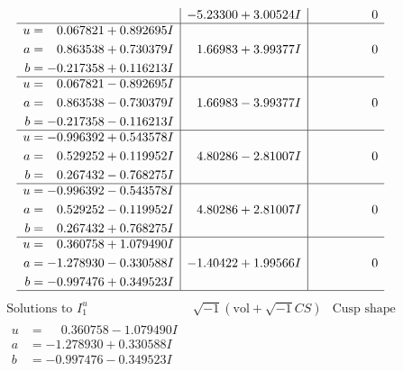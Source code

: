 \documentclass[1p]{elsarticle_modified}
\theoremstyle{definition}
\newcommand{\I}{\sqrt{-1}}
\begin{document}
$$\begin{array}{c|c|c}
 & -5.23300 + 3.00524 I & \phantom{-0.000000 } 0 \\ \hline\begin{aligned}
u &= \phantom{-}0.067821 + 0.892695 I \\
a &= \phantom{-}0.863538 + 0.730379 I \\
b &= -0.217358 + 0.116213 I\end{aligned}
 & \phantom{-}1.66983 + 3.99377 I & \phantom{-0.000000 } 0 \\ \hline\begin{aligned}
u &= \phantom{-}0.067821 - 0.892695 I \\
a &= \phantom{-}0.863538 - 0.730379 I \\
b &= -0.217358 - 0.116213 I\end{aligned}
 & \phantom{-}1.66983 - 3.99377 I & \phantom{-0.000000 } 0 \\ \hline\begin{aligned}
u &= -0.996392 + 0.543578 I \\
a &= \phantom{-}0.529252 + 0.119952 I \\
b &= \phantom{-}0.267432 - 0.768275 I\end{aligned}
 & \phantom{-}4.80286 - 2.81007 I & \phantom{-0.000000 } 0 \\ \hline\begin{aligned}
u &= -0.996392 - 0.543578 I \\
a &= \phantom{-}0.529252 - 0.119952 I \\
b &= \phantom{-}0.267432 + 0.768275 I\end{aligned}
 & \phantom{-}4.80286 + 2.81007 I & \phantom{-0.000000 } 0 \\ \hline\begin{aligned}
u &= \phantom{-}0.360758 + 1.079490 I \\
a &= -1.278930 - 0.330588 I \\
b &= -0.997476 + 0.349523 I\end{aligned}
 & -1.40422 + 1.99566 I & \phantom{-0.000000 } 0\\
 \hline 
 \end{array}$$\newpage$$\begin{array}{c|c|c}  
\text{Solutions to }I^u_{1}& \I (\text{vol} + \sqrt{-1}CS) & \text{Cusp shape}\\
 \hline 
\begin{aligned}
u &= \phantom{-}0.360758 - 1.079490 I \\
a &= -1.278930 + 0.330588 I \\
b &= -0.997476 - 0.349523 I\end{aligned}

\end{array}$$
\end{document}
